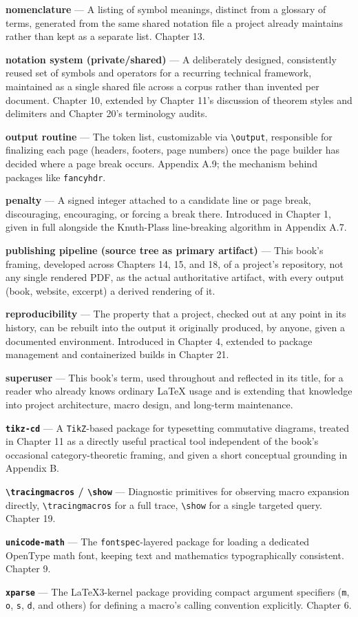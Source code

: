 \textbf{nomenclature} --- A listing of symbol meanings, distinct from a glossary of terms, generated from the same shared notation file a project already maintains rather than kept as a separate list. Chapter 13.

\textbf{notation system (private/shared)} --- A deliberately designed, consistently reused set of symbols and operators for a recurring technical framework, maintained as a single shared file across a corpus rather than invented per document. Chapter 10, extended by Chapter 11's discussion of theorem styles and delimiters and Chapter 20's terminology audits.

\textbf{output routine} --- The token list, customizable via \texttt{\textbackslash{}output}, responsible for finalizing each page (headers, footers, page numbers) once the page builder has decided where a page break occurs. Appendix A.9; the mechanism behind packages like \texttt{fancyhdr}.

\textbf{penalty} --- A signed integer attached to a candidate line or page break, discouraging, encouraging, or forcing a break there. Introduced in Chapter 1, given in full alongside the Knuth-Plass line-breaking algorithm in Appendix A.7.

\textbf{publishing pipeline (source tree as primary artifact)} --- This book's framing, developed across Chapters 14, 15, and 18, of a project's repository, not any single rendered PDF, as the actual authoritative artifact, with every output (book, website, excerpt) a derived rendering of it.

\textbf{reproducibility} --- The property that a project, checked out at any point in its history, can be rebuilt into the output it originally produced, by anyone, given a documented environment. Introduced in Chapter 4, extended to package management and containerized builds in Chapter 21.

\textbf{superuser} --- This book's term, used throughout and reflected in its title, for a reader who already knows ordinary LaTeX usage and is extending that knowledge into project architecture, macro design, and long-term maintenance.

\textbf{\texttt{tikz-cd}} --- A \texttt{TikZ}-based package for typesetting commutative diagrams, treated in Chapter 11 as a directly useful practical tool independent of the book's occasional category-theoretic framing, and given a short conceptual grounding in Appendix B.

\textbf{\texttt{\textbackslash{}tracingmacros} / \texttt{\textbackslash{}show}} --- Diagnostic primitives for observing macro expansion directly, \texttt{\textbackslash{}tracingmacros} for a full trace, \texttt{\textbackslash{}show} for a single targeted query. Chapter 19.

\textbf{\texttt{unicode-math}} --- The \texttt{fontspec}-layered package for loading a dedicated OpenType math font, keeping text and mathematics typographically consistent. Chapter 9.

\textbf{\texttt{xparse}} --- The LaTeX3-kernel package providing compact argument specifiers (\texttt{m}, \texttt{o}, \texttt{s}, \texttt{d}, and others) for defining a macro's calling convention explicitly. Chapter 6.
